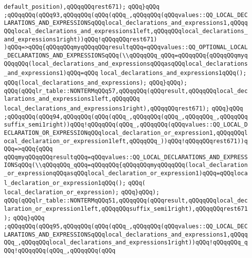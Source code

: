 \verb|default_position),qQQqqQQqrest671);|\newline
\verb|qQQq}qQQq|\newline
\verb|;qQQqqQQq(qQQq93,qQQqqQQq(qQQq(qQQq_,qQQqqQQq(qQQqvalues::QQ_LOCAL_DECLARATIONS_AND_EXPRESSIONSqQQqlocal_declarations_and_expressions1,qQQqqQQqlocal_declarations_and_expressions1left,qQQqqQQqlocal_declarations_and_expressions1right))qQQq!qQQqqQQqrest671)|\newline
\verb|)qQQq=>qQQq{qQQqqQQqmyqQQqqQQqresultqQQq=qQQqvalues::QQ_OPTIONAL_LOCAL_DECLARATIONS_AND_EXPRESSIONSqQQq(\\qQQqqQQq_qQQq=qQQqqQQq{qQQqqQQqmyqQQqqQQq(local_declarations_and_expressionsqQQqasqQQqlocal_declarations_and_expressions1)qQQq=qQQq|\newline
\verb|local_declarations_and_expressions1qQQq();|\newline
\verb|qQQq(local_declarations_and_expressions);|\newline
\verb|qQQq}qQQq);|\newline
\verb|qQQq(qQQqlr_table::NONTERMqQQq57,qQQqqQQq(qQQqresult,qQQqqQQqlocal_declarations_and_expressions1left,qQQqqQQq|\newline
\verb|local_declarations_and_expressions1right),qQQqqQQqrest671);|\newline
\verb|qQQq}qQQq|\newline
\verb|;qQQqqQQq(qQQq94,qQQqqQQq(qQQq(qQQq_,qQQqqQQq(qQQq_,qQQqqQQq_,qQQqqQQqsuffix_semi1right))qQQq!qQQqqQQq(qQQq_,qQQqqQQq(qQQqvalues::QQ_LOCAL_DECLARATION_OR_EXPRESSIONqQQqlocal_declaration_or_expression1,qQQqqQQqlocal_declaration_or_expression1left,qQQqqQQq_))qQQq!qQQqqQQqrest671))qQQq=>qQQq{qQQq|\newline
\verb|qQQqmyqQQqqQQqresultqQQq=qQQqvalues::QQ_LOCAL_DECLARATIONS_AND_EXPRESSIONSqQQq(\\qQQqqQQq_qQQq=qQQqqQQq{qQQqqQQqmyqQQqqQQq(local_declaration_or_expressionqQQqasqQQqlocal_declaration_or_expression1)qQQq=qQQqlocal_declaration_or_expression1qQQq();|\newline
\verb|qQQq(|\newline
\verb|local_declaration_or_expression);|\newline
\verb|qQQq}qQQq);|\newline
\verb|qQQq(qQQqlr_table::NONTERMqQQq51,qQQqqQQq(qQQqresult,qQQqqQQqlocal_declaration_or_expression1left,qQQqqQQqsuffix_semi1right),qQQqqQQqrest671);|\newline
\verb|qQQq}qQQq|\newline
\verb|;qQQqqQQq(qQQq95,qQQqqQQq(qQQq(qQQq_,qQQqqQQq(qQQqvalues::QQ_LOCAL_DECLARATIONS_AND_EXPRESSIONSqQQqlocal_declarations_and_expressions1,qQQqqQQq_,qQQqqQQqlocal_declarations_and_expressions1right))qQQq!qQQqqQQq_qQQq!qQQqqQQq(qQQq_,qQQqqQQq(qQQq|\newline
